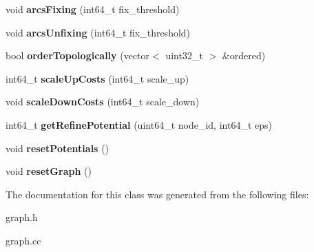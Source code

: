 \begin{DoxyCompactItemize}
\item 
\hypertarget{classflowlessly_1_1Graph_a45f3b9a73e7a291cc5c930dad28dbfd1}{void {\bfseries arcs\-Fixing} (int64\-\_\-t fix\-\_\-threshold)}\label{classflowlessly_1_1Graph_a45f3b9a73e7a291cc5c930dad28dbfd1}

\item 
\hypertarget{classflowlessly_1_1Graph_ab0668cf590fb66e153da80a9cff0f8a0}{void {\bfseries arcs\-Unfixing} (int64\-\_\-t fix\-\_\-threshold)}\label{classflowlessly_1_1Graph_ab0668cf590fb66e153da80a9cff0f8a0}

\item 
\hypertarget{classflowlessly_1_1Graph_af5e993b70dcdbdfc180bb8dfaef0cc6b}{bool {\bfseries order\-Topologically} (vector$<$ uint32\-\_\-t $>$ \&ordered)}\label{classflowlessly_1_1Graph_af5e993b70dcdbdfc180bb8dfaef0cc6b}

\item 
\hypertarget{classflowlessly_1_1Graph_ab40c3233792f830f1eecef711cb6f570}{int64\-\_\-t {\bfseries scale\-Up\-Costs} (int64\-\_\-t scale\-\_\-up)}\label{classflowlessly_1_1Graph_ab40c3233792f830f1eecef711cb6f570}

\item 
\hypertarget{classflowlessly_1_1Graph_a7b03cb9ecbe2a962fba0304f4c379177}{void {\bfseries scale\-Down\-Costs} (int64\-\_\-t scale\-\_\-down)}\label{classflowlessly_1_1Graph_a7b03cb9ecbe2a962fba0304f4c379177}

\item 
\hypertarget{classflowlessly_1_1Graph_a6caaa92647c84fb6ee437209116eab6d}{int64\-\_\-t {\bfseries get\-Refine\-Potential} (uint64\-\_\-t node\-\_\-id, int64\-\_\-t eps)}\label{classflowlessly_1_1Graph_a6caaa92647c84fb6ee437209116eab6d}

\item 
\hypertarget{classflowlessly_1_1Graph_af32b31ea87c3641e67525c18733fc4a1}{void {\bfseries reset\-Potentials} ()}\label{classflowlessly_1_1Graph_af32b31ea87c3641e67525c18733fc4a1}

\item 
\hypertarget{classflowlessly_1_1Graph_af9798efb566421f6a2c0ce0eb4f89e23}{void {\bfseries reset\-Graph} ()}\label{classflowlessly_1_1Graph_af9798efb566421f6a2c0ce0eb4f89e23}

\end{DoxyCompactItemize}


\-The documentation for this class was generated from the following files\-:\begin{DoxyCompactItemize}
\item 
graph.\-h\item 
graph.\-cc\end{DoxyCompactItemize}
